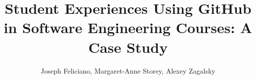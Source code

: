 \documentclass{sig-alternate}
\begin{document}
%

\title{Student Experiences Using GitHub in Software Engineering Courses: A Case Study}

%
%
%
%
%

%
\author{
       \alignauthor Joseph Feliciano, Margaret-Anne Storey, Alexey Zagalsky\\
       \\
       \\
       \\
}
\end{document}
